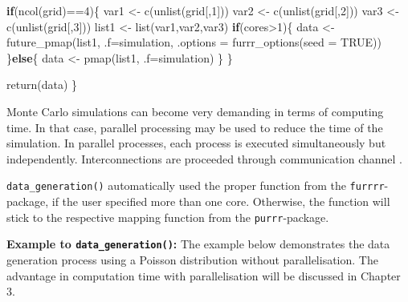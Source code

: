 \documentclass[11pt,a4paper]{article}
\newenvironment{Shaded}{\begin{snugshade}}{\end{snugshade}}
\newcommand{\AttributeTok}[1]{\textcolor[rgb]{0.77,0.63,0.00}{#1}}
\newcommand{\ConstantTok}[1]{\textcolor[rgb]{0.00,0.00,0.00}{#1}}
\newcommand{\ControlFlowTok}[1]{\textcolor[rgb]{0.13,0.29,0.53}{\textbf{#1}}}
\newcommand{\DecValTok}[1]{\textcolor[rgb]{0.00,0.00,0.81}{#1}}
\newcommand{\FunctionTok}[1]{\textcolor[rgb]{0.00,0.00,0.00}{#1}}
\newcommand{\NormalTok}[1]{#1}
\newcommand{\OtherTok}[1]{\textcolor[rgb]{0.56,0.35,0.01}{#1}}
\newcommand{\SpecialCharTok}[1]{\textcolor[rgb]{0.00,0.00,0.00}{#1}}
\begin{document}
\begin{Shaded}
\begin{Highlighting}[]
  \ControlFlowTok{if}\NormalTok{(}\FunctionTok{ncol}\NormalTok{(grid)}\SpecialCharTok{==}\DecValTok{4}\NormalTok{)\{}
\NormalTok{    var1 }\OtherTok{\textless{}{-}} \FunctionTok{c}\NormalTok{(}\FunctionTok{unlist}\NormalTok{(grid[,}\DecValTok{1}\NormalTok{]))}
\NormalTok{    var2 }\OtherTok{\textless{}{-}} \FunctionTok{c}\NormalTok{(}\FunctionTok{unlist}\NormalTok{(grid[,}\DecValTok{2}\NormalTok{]))}
\NormalTok{    var3 }\OtherTok{\textless{}{-}} \FunctionTok{c}\NormalTok{(}\FunctionTok{unlist}\NormalTok{(grid[,}\DecValTok{3}\NormalTok{]))}
\NormalTok{    list1 }\OtherTok{\textless{}{-}} \FunctionTok{list}\NormalTok{(var1,var2,var3)}
    \ControlFlowTok{if}\NormalTok{(cores}\SpecialCharTok{\textgreater{}}\DecValTok{1}\NormalTok{)\{}
\NormalTok{      data }\OtherTok{\textless{}{-}} \FunctionTok{future\_pmap}\NormalTok{(list1, }\AttributeTok{.f=}\NormalTok{simulation,}
                          \AttributeTok{.options =} \FunctionTok{furrr\_options}\NormalTok{(}\AttributeTok{seed =} \ConstantTok{TRUE}\NormalTok{))}
\NormalTok{    \}}\ControlFlowTok{else}\NormalTok{\{}
\NormalTok{      data }\OtherTok{\textless{}{-}} \FunctionTok{pmap}\NormalTok{(list1, }\AttributeTok{.f=}\NormalTok{simulation)}
\NormalTok{    \}}
\NormalTok{  \}}
  
  \FunctionTok{return}\NormalTok{(data)}
\NormalTok{\}}
\end{Highlighting}
\end{Shaded}

Monte Carlo simulations can become very demanding in terms of computing
time. In that case, parallel processing may be used to reduce the time
of the simulation. In parallel processes, each process is executed
simultaneously but independently. Interconnections are proceeded through
communication channel \autocite{Czech_2017}.

\texttt{data\_generation()} automatically used the proper function from
the \texttt{furrrr}-package, if the user specified more than one core.
Otherwise, the function will stick to the respective mapping function
from the \texttt{purrr}-package.

\textbf{Example to \texttt{data\_generation()}:} The example below
demonstrates the data generation process using a Poisson distribution
without parallelisation. The advantage in computation time with
parallelisation will be discussed in Chapter 3.
\end{document}
